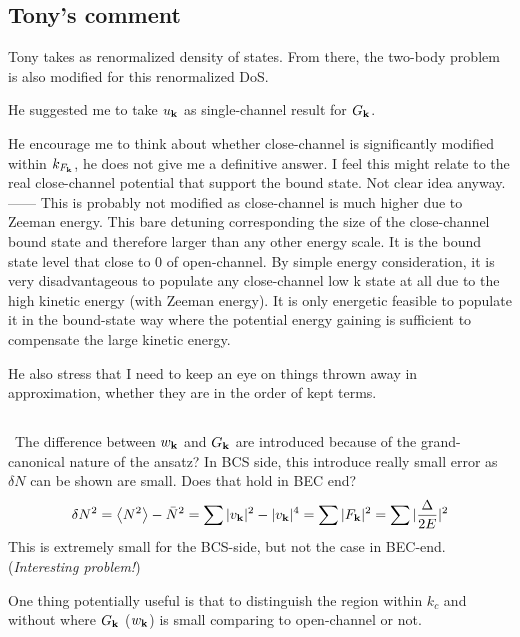 \subsection{Tony's comment}
Tony takes  as renormalized density of states.  From there, the two-body problem is also modified for this renormalized DoS. 

He suggested me to take $u_{\mathbf{k}}$ as single-channel result for $G_{\mathbf{k}}$.   

He encourage me to think about whether close-channel is significantly modified within $k_{F_{\mathbf{k}}}$, he does not give me a definitive answer.  I feel this might relate to the real close-channel potential that support the bound state.  Not clear idea anyway.  
------ This is probably not modified as close-channel is much higher due to Zeeman energy.  This bare detuning corresponding the size of the close-channel bound state and therefore larger than any other energy scale.   It is the bound state level that close to 0 of open-channel.  By simple energy consideration, it is very disadvantageous to populate any close-channel low k state at all due to the high kinetic energy (with Zeeman energy).  It is only energetic feasible to populate it in the bound-state way where the potential energy gaining is sufficient to compensate the large kinetic energy.  

He also stress that I need to keep an eye on things thrown away in approximation,  whether they are in the order of kept terms.  

\subsection{\label{sec:20100915:deltaN}}\
The difference between $w_{\mathbf{k}}$ and $G_{\mathbf{k}}$ are introduced because of the grand-canonical nature of the ansatz?  In BCS side, this introduce really small error as $\delta{N}$ can be shown are small.  Does that hold in BEC end?
\begin{equation}
\delta{N}^{2}=\bigl<{N^{2}}\bigr>-\bar{N}^{2}=\sum{\ensuremath{\lvert{v_{\ensuremath{\mathbf{k}}}}\rvert}^{2}-\ensuremath{\lvert{v_{\ensuremath{\mathbf{k}}}}\rvert}^{4}}=\sum{\ensuremath{\lvert{F_{\ensuremath{\mathbf{k}}}}\rvert}^{2}}
	=\sum{\ensuremath{\lvert{\frac{\Delta}{2E}}\rvert}^{2}}
\end{equation}
This is extremely small for the BCS-side, but not the case in BEC-end.  (\emph{Interesting problem!})

One thing potentially useful is that to distinguish the region within $k_{c}$ and without where $G_{\mathbf{k}}$ ($w_{\mathbf{k}}$) is small comparing to open-channel or not.  

